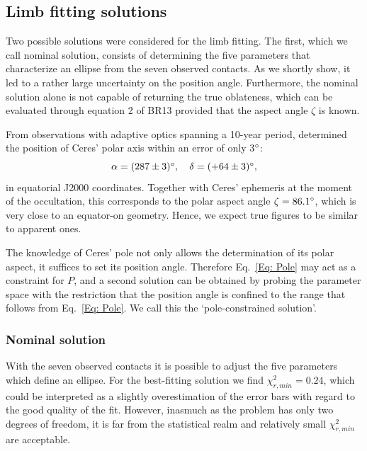 \documentclass[useAMS,usenatbib]{mn2e}
\begin{document}
\subsection{Limb fitting solutions}\label{Sec: limbfitting-2010}

Two possible solutions were considered for the limb fitting. The first, which we call nominal solution, consists of determining the five parameters that characterize an ellipse from the seven observed contacts. As we shortly show, it led to a rather large uncertainty on the position angle. Furthermore, the nominal solution alone is not capable of returning the true oblateness, which can be evaluated through equation 2 of BR13  provided that the aspect angle $\zeta$ is known.%

From observations with adaptive optics spanning a 10-year period, \cite{Drummond2014} determined the position of Ceres' polar axis within an error of only 3$\hbox{$^\circ$}$:
\begin{equation}
\alpha = (287 \pm 3) \degr, \quad %
\delta = (+64 \pm 3) \degr,
\label{Eq: Pole}
\end{equation}
%
in equatorial J2000 coordinates. Together with Ceres' ephemeris at the moment of the occultation, this corresponds to the polar aspect angle $\zeta = 86.1\hbox{$^\circ$}$, which is very close to an equator-on geometry. Hence, we expect true figures to be similar to apparent ones.

The knowledge of Ceres' pole not only allows the determination of its polar aspect, it suffices to set its position angle. Therefore Eq.~\ref{Eq: Pole} may act as a constraint for $P$, and a second solution can be obtained by probing the parameter space with the restriction that the position angle is confined to the range that follows from Eq.~\ref{Eq: Pole}. We call this the `pole-constrained solution'.


\subsubsection{Nominal solution}

With the seven observed contacts it is possible to adjust the five parameters which define an ellipse. For the best-fitting solution we find $\chi^2_{r,min} = 0.24$, which could be interpreted as a slightly overestimation of the error bars with regard to the good quality of the fit. However, inasmuch as the problem has only two degrees of freedom, it is far from the statistical realm and relatively small $\chi^2_{r,min}$ are acceptable.
\end{document}

